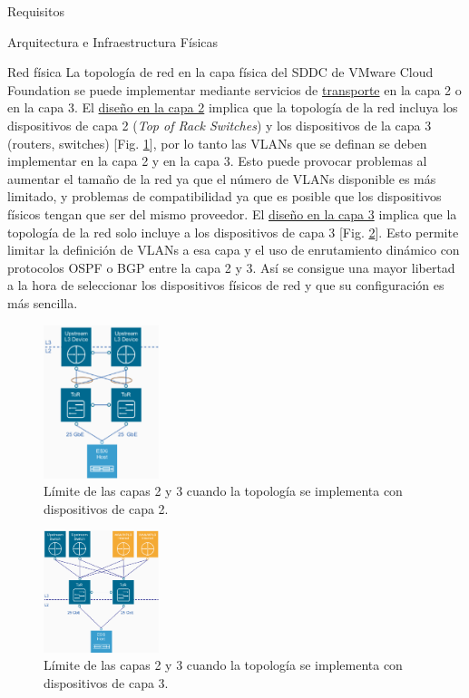 \begin{section}{Requisitos}
\begin{subsection}{Arquitectura e Infraestructura Físicas \cite{CFfisInfraestuctura}}
\begin{subsubsection}{Red física}
La topología de red en la capa física del SDDC de VMware Cloud Foundation se puede implementar mediante servicios de \underline{transporte} en la capa 2 o en la capa 3. El \underline{diseño en la capa 2} implica que la topología de la red incluya los dispositivos de capa 2 (\textit{Top of Rack Switches}) y los dispositivos de la capa 3 (routers, switches) [Fig. \ref{fig:transportlayer2}], por lo tanto las VLANs que se definan se deben implementar en la capa 2 y en la capa 3. Esto puede provocar problemas al aumentar el tamaño de la red ya que el número de VLANs disponible es más limitado, y problemas de compatibilidad ya que es posible que los dispositivos físicos tengan que ser del mismo proveedor. El \underline{diseño en la capa 3} implica que la topología de la red solo incluye a los dispositivos de capa 3 [Fig. \ref{fig:transportlayer3}]. Esto permite limitar la definición de VLANs a esa capa y el uso de enrutamiento dinámico con protocolos OSPF o BGP entre la capa 2 y 3. Así se consigue una mayor libertad a la hora de seleccionar los dispositivos físicos de red y que su configuración es más sencilla.
\begin{figure}[h!]
  \centering
  \includegraphics[width=0.3\textwidth]{imaxes/conceptosPrevios/transportlayer2.png}
  \caption{Límite de las capas 2 y 3 cuando la topología se implementa con dispositivos de capa 2.}
  \label{fig:transportlayer2}
\end{figure}
\FloatBarrier
\begin{figure}[h!]
  \centering
  \includegraphics[width=0.3\textwidth]{imaxes/conceptosPrevios/transportNetLayer3.png}
  \caption{Límite de las capas 2 y 3 cuando la topología se implementa con dispositivos de capa 3.}
  \label{fig:transportlayer3}
\end{figure}
\FloatBarrier




\end{subsubsection}
\end{subsection}
\end{section}
